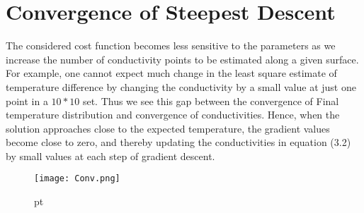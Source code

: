 \documentclass[10pt,a4paper]{report}
\begin{document}
\section{Convergence of Steepest Descent}

The considered cost function becomes less sensitive to the parameters as we increase the number of conductivity points to be estimated along a given surface. For example, one cannot expect much change in the least square estimate of temperature difference by changing the conductivity by a small value at just one point in a $10*10$ set. Thus we see this gap between the convergence of Final temperature distribution and convergence of conductivities. Hence, when the solution approaches close to the expected temperature, the gradient values become close to zero, and thereby updating the conductivities in equation (3.2)  by small values at each step of gradient descent.
\begin{figure}[h]
\begin{center}
\texttt{[image: Conv.png]} 
\caption{}  pt
\label{fig:Conv}
\end{center}
\end{figure}


%
%
%
\end{document}

